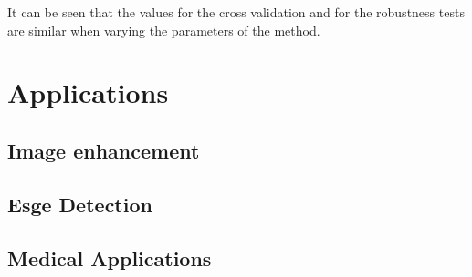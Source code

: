 \documentclass[oneside,a4paper,english,links]{article}
\begin{document}
It can be seen that the values for the cross validation and for the robustness tests are similar when varying the parameters of the method.

\section{Applications}
\subsection{Image enhancement}
\subsection{Esge Detection}
\subsection{Medical Applications}






\end{document}
